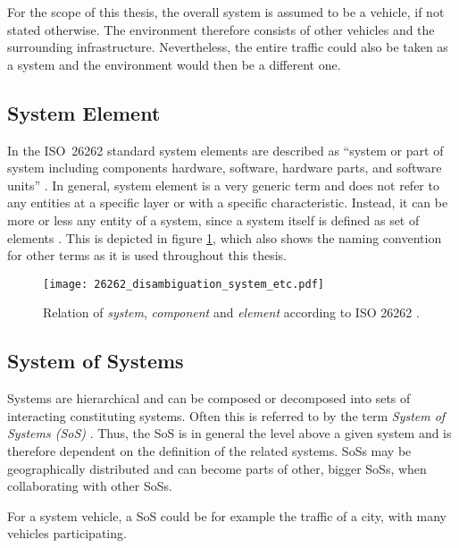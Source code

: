 For the scope of this thesis, the overall system is assumed to be a vehicle, if not stated otherwise. The environment therefore consists of other vehicles and the surrounding infrastructure. Nevertheless, the entire traffic could also be taken as a system and the environment would then be a different one.



\subsection{System Element}
\label{sec:system_element}
In the \mbox{ISO 26262} standard system elements are described as ``system or part of system including components hardware, software, hardware parts, and software units'' \cite{iso26262:1}. In general, system element is a very generic term and does not refer to any entities at a specific layer or with a specific characteristic. Instead, it can be more or less any entity of a system, since a system itself is defined as set of elements \cite{iso26262:1}. This is depicted in figure \ref{fig:26262_disambiguation}, which also shows the naming convention for other terms as it is used throughout this thesis.

\begin{figure}[!htbp]
\centering
\texttt{[image: 26262\_disambiguation\_system\_etc.pdf]}

\caption{Relation of \emph{system}, \emph{component} and \emph{element} according to ISO 26262 \cite{iso26262:course1}.}
\label{fig:26262_disambiguation}
\end{figure}


\subsection{System of Systems}
Systems are hierarchical and can be composed or decomposed into sets of interacting constituting systems. Often this is referred to by the term \emph{System of Systems (SoS)} \cite[p.7]{genesys}. Thus, the SoS is in general the level above a given system and is therefore dependent on the definition of the related systems. SoSs may be geographically distributed and can become parts of other, bigger SoSs, when collaborating with other SoSs.

For a system vehicle, a SoS could be for example the traffic of a city, with many vehicles participating.


